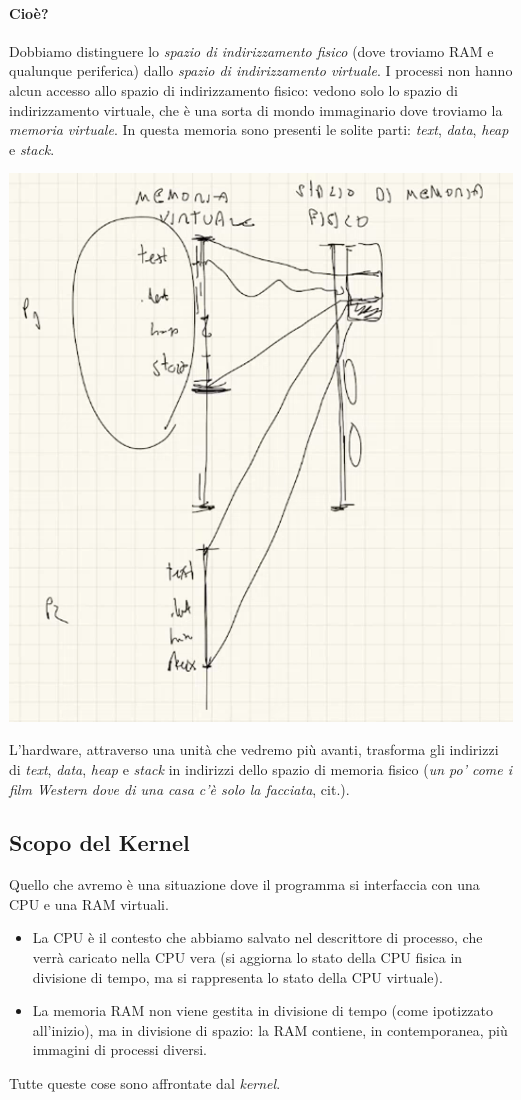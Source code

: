 \documentclass[11pt]{report}
\theoremstyle{definition}
\begin{document}
\paragraph{Cioè?} Dobbiamo distinguere lo \emph{spazio di indirizzamento fisico} (dove troviamo RAM e qualunque periferica) dallo \emph{spazio di indirizzamento virtuale}. I processi non hanno alcun accesso allo spazio di indirizzamento fisico: vedono solo lo spazio di indirizzamento virtuale, che è una sorta di mondo immaginario dove troviamo la \emph{memoria virtuale}. In questa memoria sono presenti le solite parti: \emph{text}, \emph{data}, \emph{heap} e \emph{stack}.
\begin{center}
	\includegraphics[scale=.65]{img/209.PNG}
\end{center} 
L'hardware, attraverso una unità che vedremo più avanti, trasforma gli indirizzi di \emph{text}, \emph{data}, \emph{heap} e \emph{stack} in indirizzi dello spazio di memoria fisico (\textit{un po' come i film Western dove di una casa c'è solo la facciata}, cit.).
\subsection{Scopo del Kernel} Quello che avremo è una situazione dove il programma si interfaccia con una CPU e una RAM virtuali.
\begin{itemize}
	\item La CPU è il contesto che abbiamo salvato nel descrittore di processo, che verrà caricato nella CPU vera (si aggiorna lo stato della CPU fisica in divisione di tempo, ma si rappresenta lo stato della CPU virtuale).
	\item La memoria RAM non viene gestita in divisione di tempo (come ipotizzato all'inizio), ma in divisione di spazio: la RAM contiene, in contemporanea, più immagini di processi diversi.
\end{itemize} 
Tutte queste cose sono affrontate dal \emph{kernel}.
\end{document}
